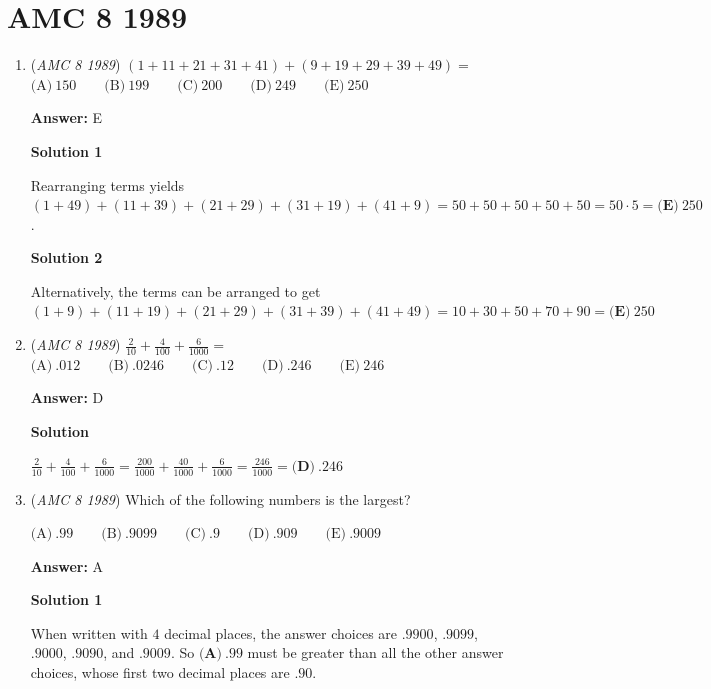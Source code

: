 \section{AMC 8 1989}
        \begin{enumerate}
        	\item (\textit{AMC 8 1989}) $(1+11+21+31+41)+(9+19+29+39+49)=$
$\text{(A)}\ 150 \qquad \text{(B)}\ 199 \qquad \text{(C)}\ 200 \qquad \text{(D)}\ 249 \qquad \text{(E)}\ 250$

 \textbf{Answer: }E



\textbf{Solution 1}

Rearranging terms yields $(1+49)+(11+39)+(21+29)+(31+19)+(41+9) = 50+50+50+50+50 =50\cdot 5 = \boxed{\textbf{(E)}\ 250}$.

 



\textbf{Solution 2}

Alternatively, the terms can be arranged to get $(1+9)+(11+19)+(21+29)+(31+39)+(41+49) = 10+30+50+70+90 = \boxed{\textbf{(E)}\ 250}$



	\item (\textit{AMC 8 1989}) $\frac{2}{10}+\frac{4}{100}+\frac{6}{1000} =$
$\text{(A)}\ .012 \qquad \text{(B)}\ .0246 \qquad \text{(C)}\ .12 \qquad \text{(D)}\ .246 \qquad \text{(E)}\ 246$

 \textbf{Answer: }D



\textbf{Solution}

$\frac{2}{10}+\frac{4}{100}+\frac{6}{1000} = \frac{200}{1000}+\frac{40}{1000}+\frac{6}{1000} = \frac{246}{1000} = \boxed{\textbf{(D)}\ .246}$



	\item (\textit{AMC 8 1989}) Which of the following numbers is the largest?


 $\text{(A)}\ .99 \qquad \text{(B)}\ .9099 \qquad \text{(C)}\ .9 \qquad \text{(D)}\ .909 \qquad \text{(E)}\ .9009$

 \textbf{Answer: }A



\textbf{Solution 1}

When written with $4$ decimal places, the answer choices are $.9900$, $.9099$, $.9000$, $.9090$, and $.9009$.  So $\boxed{\textbf{(A)}\ .99}$ must be greater than all the other answer choices, whose first two decimal places are $.90$.


\end{enumerate}
